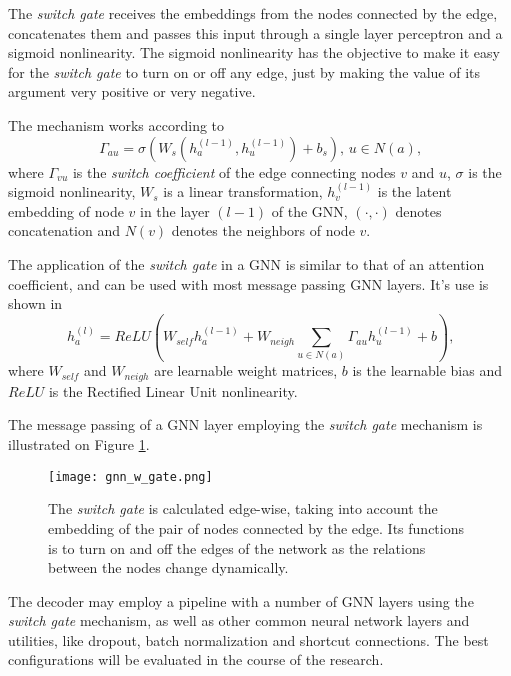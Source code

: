 \documentclass[12pt,a4paper]{article}
\begin{document}
	The \emph{switch gate} receives the embeddings from the nodes connected by the edge, concatenates them and passes this input through a single layer perceptron and a sigmoid nonlinearity. The sigmoid nonlinearity has the objective to make it easy for the \emph{switch gate} to turn on or off any edge, just by making the value of its argument very positive or very negative.
	
	The mechanism works according to
	\begin{equation}
		\Gamma_{au}=\sigma\left(W_s(h^{(l-1)}_a, h^{(l-1)}_u) + b_s\right)\!\text{, }  u \in N(a)\text{,} \label{switch}
	\end{equation}
	where $\Gamma_{vu}$ is the \emph{switch coefficient} of the edge connecting nodes $v$ and $u$, $\sigma$ is the sigmoid nonlinearity, $W_s$ is a linear transformation, $h^{(l-1)}_v$ is the latent embedding of node $v$ in the layer $(l-1)$ of the GNN, $(\cdot,\cdot)$ denotes concatenation and $N(v)$ denotes the neighbors of node $v$.
	
	The application of the \emph{switch gate} in a GNN is similar to that of an attention coefficient, and can be used with most message passing GNN layers. It’s use is shown in
	\begin{equation}
		h^{(l)}_a = ReLU\left(W_{self}h^{(l-1)}_a+W_{neigh}\sum_{u \in N(a)}\Gamma_{au}h^{(l-1)}_u + b\right)\text{,} \label{gnn}
	\end{equation}
	where $W_{self}$ and $W_{neigh}$ are learnable weight matrices, $b$ is the learnable bias and $ReLU$ is the Rectified Linear Unit nonlinearity.
	
	The message passing of a GNN layer employing the \emph{switch gate} mechanism is illustrated on Figure \ref{gate}.
	
	\begin{figure}[hbtp]
		\centering \texttt{[image: gnn\_w\_gate.png]}
		\caption{The \emph{switch gate} is calculated edge-wise, taking into account the embedding of the pair of nodes connected by the edge. Its functions is to turn on and off the edges of the network as the relations between the nodes change dynamically. \label{gate}}
	\end{figure}
	
	
	The decoder may employ a pipeline with a number of GNN layers using the \emph{switch gate} mechanism, as well as other common neural network layers and utilities, like dropout, batch normalization and shortcut connections. The best configurations will be evaluated in the course of the research.
	
\end{document}
